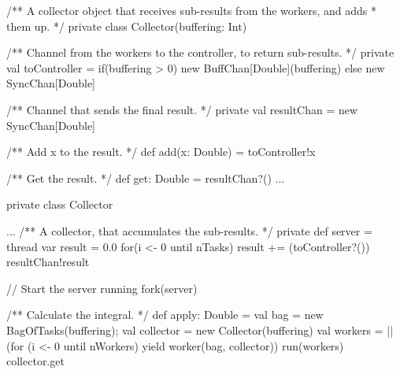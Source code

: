 \begin{slide}

\begin{scala}
  /** A collector object that receives sub-results from the workers, and adds
    * them up. */
  private class Collector(buffering: Int){
    /** Channel from the workers to the controller, to return sub-results. */
    private val toController = 
      if(buffering > 0) new BuffChan[Double](buffering) else new SyncChan[Double]

    /** Channel that sends the final result. */
    private val resultChan = new SyncChan[Double]

    /** Add x to the result. */
    def add(x: Double) = toController!x

    /** Get the result. */
    def get: Double = resultChan?()
    ...
  }
\end{scala}
\end{slide}


\begin{slide}

\begin{scala}
  private class Collector{
    ...
    /** A collector, that accumulates the sub-results. */
    private def server = thread{
      var result = 0.0
      for(i <- 0 until nTasks) result += (toController?())
      resultChan!result
    }

    // Start the server running
    fork(server)
  }
\end{scala}
\end{slide}


\begin{slide}

\begin{scala}
  /** Calculate the integral. */
  def apply: Double = {
    val bag = new BagOfTasks(buffering); val collector = new Collector(buffering)
    val workers = || (for (i <- 0 until nWorkers) yield worker(bag, collector))
    run(workers)
    collector.get
  }
\end{scala}
\end{slide}  


